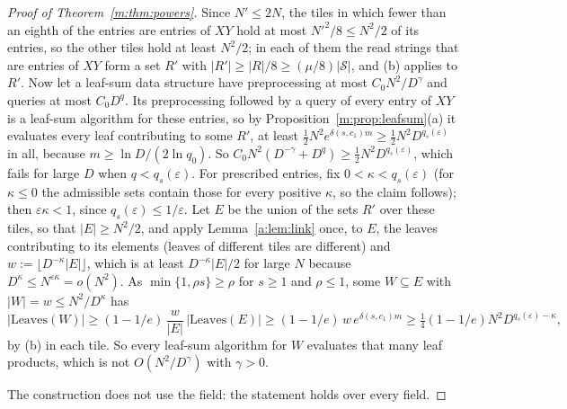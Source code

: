 \documentclass[11pt]{article}
\theoremstyle{definition}
\theoremstyle{remark}
\newcommand{\Leaves}{\mathrm{Leaves}}
\begin{document}
\begin{proof}[Proof of Theorem~\ref{m:thm:powers}]
Since $N'\le2N$, the tiles in which fewer than an eighth of the entries are entries of $XY$ hold at most $N'^2/8\le N^2/2$ of its entries, so the other tiles hold at least $N^2/2$; in each of them the read strings that are entries of $XY$ form a set $R'$ with $|R'|\ge|R|/8\ge(\mu/8)|\mathcal S|$, and (b) applies to $R'$. Now let a leaf-sum data structure have preprocessing at most $C_0N^2/D^\gamma$ and queries at most $C_0D^q$. Its preprocessing followed by a query of every entry of $XY$ is a leaf-sum algorithm for these entries, so by Proposition~\ref{m:prop:leafsum}(a) it evaluates every leaf contributing to some $R'$, at least $\frac12N^2e^{\delta(s,c_1)m}\ge\frac12N^2D^{q_s(\varepsilon)}$ in all, because $m\ge\ln D/(2\ln q_0)$. So $C_0N^2(D^{-\gamma}+D^q)\ge\frac12N^2D^{q_s(\varepsilon)}$, which fails for large $D$ when $q<q_s(\varepsilon)$.
For prescribed entries, fix $0<\kappa<q_s(\varepsilon)$ (for $\kappa\le0$ the admissible sets contain those for every positive $\kappa$, so the claim follows); then $\varepsilon\kappa<1$, since $q_s(\varepsilon)\le1/\varepsilon$. Let $E$ be the union of the sets $R'$ over these tiles, so that $|E|\ge N^2/2$, and apply Lemma~\ref{a:lem:link} once, to $E$, the leaves contributing to its elements (leaves of different tiles are different) and $w:=\lfloor D^{-\kappa}|E|\rfloor$, which is at least $D^{-\kappa}|E|/2$ for large $N$ because $D^\kappa\le N^{\varepsilon\kappa}=o(N^2)$. As $\min\{1,\rho s\}\ge\rho$ for $s\ge1$ and $\rho\le1$, some $W\subseteq E$ with $|W|=w\le N^2/D^\kappa$ has
\[
|\Leaves(W)|\ge(1-1/e)\,\frac w{|E|}\,|\Leaves(E)|\ge(1-1/e)\,w\,e^{\delta(s,c_1)m}\ge\tfrac14(1-1/e)N^2D^{q_s(\varepsilon)-\kappa},
\]
by (b) in each tile. So every leaf-sum algorithm for $W$ evaluates that many leaf products, which is not $O(N^2/D^\gamma)$ with $\gamma>0$.

The construction does not use the field: the statement holds over every field.
\end{proof}
\end{document}
